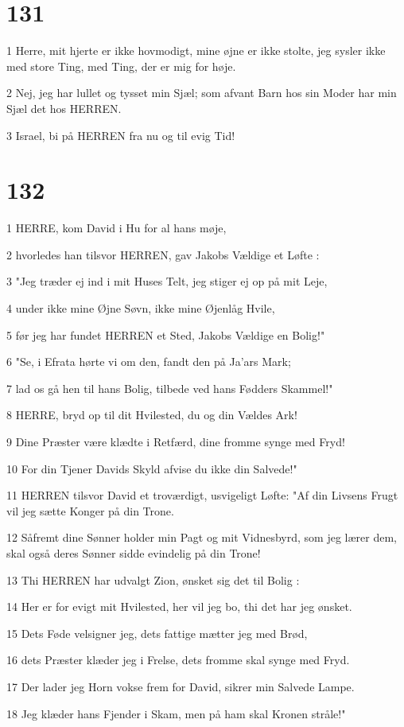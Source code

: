\chapter{131}

\par 1 Herre, mit hjerte er ikke hovmodigt, mine øjne er ikke stolte, jeg sysler ikke med store Ting, med Ting, der er mig for høje.
\par 2 Nej, jeg har lullet og tysset min Sjæl; som afvant Barn hos sin Moder har min Sjæl det hos HERREN.
\par 3 Israel, bi på HERREN fra nu og til evig Tid!

\chapter{132}

\par 1 HERRE, kom David i Hu for al hans møje,
\par 2 hvorledes han tilsvor HERREN, gav Jakobs Vældige et Løfte :
\par 3 "Jeg træder ej ind i mit Huses Telt, jeg stiger ej op på mit Leje,
\par 4 under ikke mine Øjne Søvn, ikke mine Øjenlåg Hvile,
\par 5 før jeg har fundet HERREN et Sted, Jakobs Vældige en Bolig!"
\par 6 "Se, i Efrata hørte vi om den, fandt den på Ja'ars Mark;
\par 7 lad os gå hen til hans Bolig, tilbede ved hans Fødders Skammel!"
\par 8 HERRE, bryd op til dit Hvilested, du og din Vældes Ark!
\par 9 Dine Præster være klædte i Retfærd, dine fromme synge med Fryd!
\par 10 For din Tjener Davids Skyld afvise du ikke din Salvede!"
\par 11 HERREN tilsvor David et troværdigt, usvigeligt Løfte: "Af din Livsens Frugt vil jeg sætte Konger på din Trone.
\par 12 Såfremt dine Sønner holder min Pagt og mit Vidnesbyrd, som jeg lærer dem, skal også deres Sønner sidde evindelig på din Trone!
\par 13 Thi HERREN har udvalgt Zion, ønsket sig det til Bolig :
\par 14 Her er for evigt mit Hvilested, her vil jeg bo, thi det har jeg ønsket.
\par 15 Dets Føde velsigner jeg, dets fattige mætter jeg med Brød,
\par 16 dets Præster klæder jeg i Frelse, dets fromme skal synge med Fryd.
\par 17 Der lader jeg Horn vokse frem for David, sikrer min Salvede Lampe.
\par 18 Jeg klæder hans Fjender i Skam, men på ham skal Kronen stråle!"

